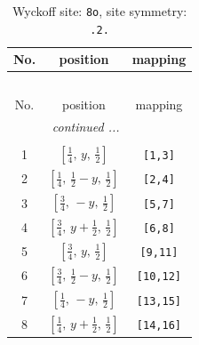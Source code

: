 \documentclass[fleqn,8pt]{jsarticle}
\begin{document}
\begin{longtable}{ccc}
\caption{Wyckoff site: {\tt 8o}, site symmetry: {\tt .2.}}
 \\
 \hline \hline
No. & position & mapping \\ \hline \endfirsthead

\multicolumn{2}{l}{\tablename\ \thetable{}} \\
 \hline \hline
No. & position & mapping \\ \hline \endhead

 \hline \hline
\multicolumn{2}{r}{\footnotesize\it continued ...} \\ \endfoot

 \hline \hline
\multicolumn{2}{r}{} \\ \endlastfoot

1 & $\left[ \frac{1}{4},\, y,\, \frac{1}{2} \right]$ & {\tt [1,3]} \\ \hline
2 & $\left[ \frac{1}{4},\, \frac{1}{2} - y,\, \frac{1}{2} \right]$ & {\tt [2,4]} \\ \hline
3 & $\left[ \frac{3}{4},\, - y,\, \frac{1}{2} \right]$ & {\tt [5,7]} \\ \hline
4 & $\left[ \frac{3}{4},\, y + \frac{1}{2},\, \frac{1}{2} \right]$ & {\tt [6,8]} \\ \hline
5 & $\left[ \frac{3}{4},\, y,\, \frac{1}{2} \right]$ & {\tt [9,11]} \\ \hline
6 & $\left[ \frac{3}{4},\, \frac{1}{2} - y,\, \frac{1}{2} \right]$ & {\tt [10,12]} \\ \hline
7 & $\left[ \frac{1}{4},\, - y,\, \frac{1}{2} \right]$ & {\tt [13,15]} \\ \hline
8 & $\left[ \frac{1}{4},\, y + \frac{1}{2},\, \frac{1}{2} \right]$ & {\tt [14,16]} \\
\end{longtable}
\renewcommand{\arraystretch}{1.2}
\end{document}
